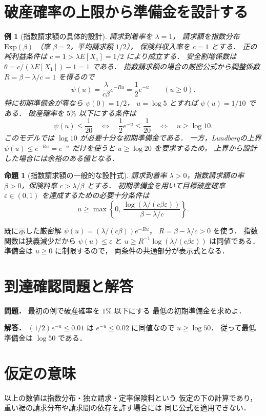 \documentclass[a5paper,10pt,onecolumn]{jsarticle}
\makeatletter
\theoremstyle{mathnotetheorem}
\newtheorem{proposition}[theorem]{命題}
\newtheorem{example}[theorem]{例}
\renewcommand{\proofname}{証明}
\renewenvironment{proof}[1][\proofname]{%
  \par\pushQED{\qed}\normalfont\topsep4\p@\@plus2\p@\relax
  \trivlist\item[\hskip\labelsep\bfseries #1]\ignorespaces
}{\popQED\endtrivlist\@endpefalse}
\makeatother
\begin{document}
\section{破産確率の上限から準備金を設計する}
\begin{example}[指数請求額の具体的設計]
請求到着率を $\lambda=1$，
請求額を指数分布 $\mathrm{Exp}(\beta)$
（率 $\beta=2$，平均請求額 $1/2$），
保険料収入率を $c=1$ とする．
正の純利益条件は
$c=1>\lambda E[X_1]=1/2$ により成立する．
安全割増係数は
$\theta=c/(\lambda E[X_1])-1=1$ である．
指数請求額の場合の厳密公式から調整係数
$R=\beta-\lambda/c=1$ を得るので
\[
 \psi(u)=\frac{\lambda}{c\beta}e^{-Ru}
        =\frac12 e^{-u}\qquad (u\ge0).
\]
特に初期準備金が零なら $\psi(0)=1/2$，
$u=\log5$ とすれば $\psi(u)=1/10$ である．
破産確率を $5\%$ 以下にする条件は
\[
 \psi(u)\le\frac1{20}
 \quad\Longleftrightarrow\quad
 \frac12 e^{-u}\le\frac1{20}
 \quad\Longleftrightarrow\quad u\ge\log10.
\]
このモデルでは $\log10$ が必要十分な初期準備金である．
一方，Lundbergの上界 $\psi(u)\le e^{-Ru}=e^{-u}$
だけを使うと $u\ge\log20$ を要求するため，
上界から設計した場合には余裕のある値となる．
\end{example}
\begin{proposition}[指数請求額の一般的な設計式]
請求到着率 $\lambda>0$，指数請求額の率
$\beta>0$，保険料率 $c>\lambda/\beta$ とする．
初期準備金を用いて目標破産確率
$\varepsilon\in(0,1)$ を達成するための必要十分条件は
\[
 u\ge \max\left\{0,\,
 \frac{\log(\lambda/(c\beta\varepsilon))}
      {\beta-\lambda/c}\right\}.
\]
\end{proposition}
\begin{proof}
既に示した厳密解
$\psi(u)=(\lambda/(c\beta))e^{-Ru}$，
$R=\beta-\lambda/c>0$ を使う．
指数関数は狭義減少だから $\psi(u)\le\varepsilon$ と
$u\ge R^{-1}\log(\lambda/(c\beta\varepsilon))$
は同値である．準備金は $u\ge0$ に制限するので，
両条件の共通部分が表示式となる．
\end{proof}
\section*{到達確認問題と解答}
\noindent\textbf{問題．}
最初の例で破産確率を $1\%$ 以下にする
最低の初期準備金を求めよ．

\medskip\noindent\textbf{解答．}
$(1/2)e^{-u}\le0.01$ は
$e^{-u}\le0.02$ に同値なので $u\ge\log50$．
従って最低準備金は $\log50$ である．
\section*{仮定の意味}
以上の数値は指数分布・独立請求・定率保険料という
仮定の下の計算であり，
重い裾の請求分布や請求間の依存を許す場合には
同じ公式を適用できない．
\end{document}
